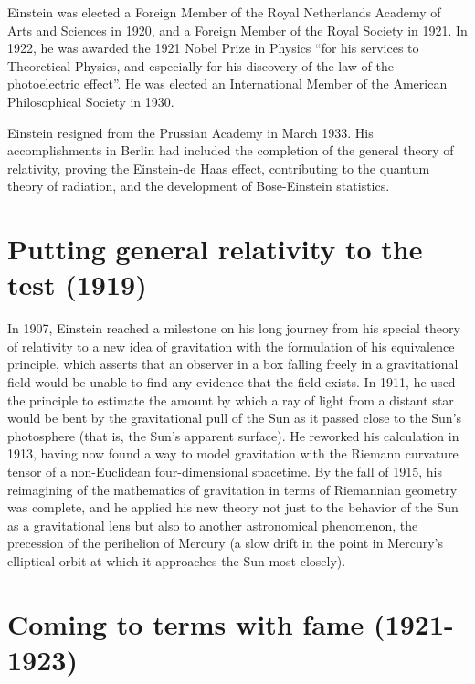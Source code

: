 \documentclass[twoside]{memoir}
\begin{document}
Einstein was elected a Foreign Member of the Royal Netherlands Academy of Arts and Sciences in 1920,\cite{3gcYy} and a Foreign Member of the Royal Society in 1921. In 1922, he was awarded the 1921 Nobel Prize  in Physics \enquote{for his services to Theoretical Physics, and especially for his discovery of the law of the photoelectric effect}. He was elected an International Member of the American Philosophical Society in 1930. 

Einstein resigned from the Prussian Academy in March 1933. His accomplishments in Berlin had included the completion of the general theory of relativity, proving the Einstein-de Haas effect, contributing to the quantum theory of radiation, and the development of Bose-Einstein statistics.

\chapter{Putting general relativity to the test (1919)}\label{putting-general-relativity-to-the-test-1919}

In 1907, Einstein reached a milestone on his long journey from his special theory of relativity to a new idea of gravitation with the formulation of his equivalence principle, which asserts that an observer in a box falling freely in a gravitational field would be unable to find any evidence that the field exists. In 1911, he used the principle to estimate the amount by which a ray of light from a distant star would be bent by the gravitational pull of the Sun as it passed close to the Sun's photosphere (that is, the Sun's apparent surface). He reworked his calculation in 1913, having now found a way to model gravitation with the Riemann curvature tensor of a non-Euclidean four-dimensional spacetime. By the fall of 1915, his reimagining of the mathematics of gravitation in terms of Riemannian geometry was complete, and he applied his new theory not just to the behavior of the Sun as a gravitational lens but also to another astronomical phenomenon, the precession of the perihelion of Mercury (a slow drift in the point in Mercury's elliptical orbit at which it approaches the Sun most closely).

\chapter{Coming to terms with fame (1921-1923)}\label{coming-to-terms-with-fame-1921-1923}
\end{document}

